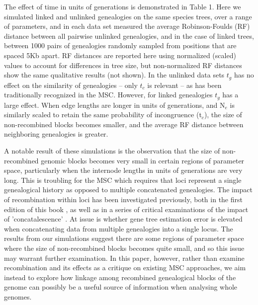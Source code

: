 \documentclass[11pt]{article}
\begin{document}
The effect of time in units of generations is demonstrated in Table 1. Here we simulated linked and unlinked genealogies on the same species trees, over a range of parameters, and in each data set measured the average Robinson-Foulds (RF) distance between all pairwise unlinked genealogies, and in the case of linked trees, between 1000 pairs of genealogies randomly sampled from positions that are spaced 5Kb apart. RF distances are reported here using normalized (scaled) values to account for differences in tree size, but non-normalized RF distances show the same qualitative results (not shown). In the unlinked data sets $t_g$ has no effect on the similarity of genealogies -- only $t_c$ is relevant -- as has been traditionally recognized in the MSC. However, for linked genealogies $t_g$ has a large effect. When edge lengths are longer in units of generations, and N$_e$ is similarly scaled to retain the same probability of incongruence (t$_c$), the size of non-recombined blocks becomes smaller, and the average RF distance between neighboring genealogies is greater. 

A notable result of these simulations is the observation that the size of non-recombined genomic blocks becomes very small in certain regions of parameter space, particularly when the internode lengths in units of generations are very long. This is troubling for the MSC which requires that loci represent a single genealogical history as opposed to multiple concatenated genealogies. The impact of recombination within loci has been investigated previously, both in the first edition of this book \citep{castillo-ramirez_bayesian_2010}, as well as in a series of critical examinations of the impact of 'concatalescence' \citep{springer_gene_2016}. At issue is whether gene tree estimation error is elevated when concatenating data from multiple genealogies into a single locus. The results from our simulations suggest there are some regions of parameter space where the size of non-recombined blocks becomes quite small, and so this issue may warrant further examination. In this paper, however, rather than examine recombination and its effects as a critique on existing MSC approaches, we aim instead to explore how linkage among recombined genealogical blocks of the genome can possibly be a useful source of information when analysing whole genomes. 
\end{document}
